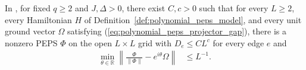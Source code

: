 \begin{theorem}
    \label{thm:openai_polynomial_peps}
    \leanok
    In \cite[Theorem~1.1]{OpenAI2026PolynomialPEPS}, for fixed $q\ge2$ and
    $J,\Delta>0$, there exist $C,c>0$ such that for every $L\ge2$, every
    Hamiltonian $H$ of Definition~\ref{def:polynomial_peps_model}, and every unit
    ground vector $\Omega$ satisfying (\ref{eq:polynomial_peps_projector_gap}),
    there is a nonzero PEPS $\Phi$ on the open $L\times L$ grid with
    $D_e\le CL^c$ for every edge $e$ and
    \begin{align}
        \min_{\theta\in\mathbb R}
        \left\|\frac{\Phi}{\|\Phi\|}-e^{i\theta}\Omega\right\| & \le L^{-1}.
        \label{eq:polynomial_peps_phase_error}
    \end{align}
\end{theorem}
